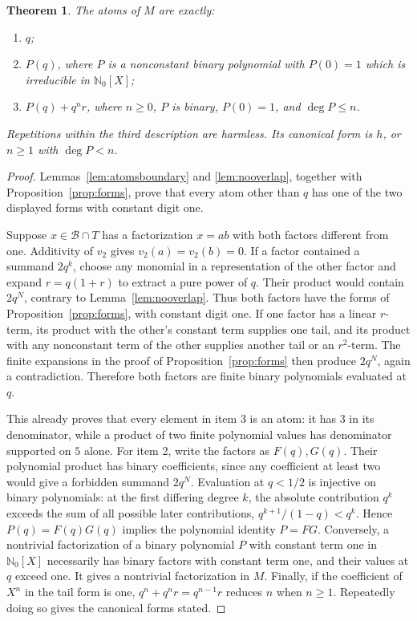 \documentclass[11pt]{article}
\newtheorem{theorem}{Theorem}[section]
\theoremstyle{definition}
\newcommand{\NN}{\mathbb N}
\begin{document}
\begin{theorem}\label{thm:classification}
The atoms of $M$ are exactly:
\begin{enumerate}
\item $q$;
\item $P(q)$, where $P$ is a nonconstant binary polynomial with $P(0)=1$
which is irreducible in $\NN_0[X]$;
\item $P(q)+q^nr$, where $n\ge0$, $P$ is binary, $P(0)=1$, and
$\deg P\le n$.
\end{enumerate}
Repetitions within the third description are harmless. Its canonical
form is $h$, or $n\ge1$ with $\deg P<n$.
\end{theorem}
\begin{proof}
Lemmas~\ref{lem:atomsboundary} and \ref{lem:nooverlap}, together with
Proposition~\ref{prop:forms}, prove that every atom other than $q$
has one of the two displayed forms with constant digit one.

Suppose $x\in\mathcal B\cap T$ has a factorization $x=ab$ with both
factors different from one. Additivity of $v_2$ gives $v_2(a)=v_2(b)=0$.
If a factor contained a summand $2q^k$,
choose any monomial in a representation of the other factor and
expand $r=q(1+r)$ to extract a pure power of $q$. Their product would
contain $2q^N$, contrary to Lemma~\ref{lem:nooverlap}.
Thus both factors have the forms of Proposition~\ref{prop:forms},
with constant digit one.
If one factor has a linear $r$-term, its product with the other's
constant term supplies one tail, and its product with any nonconstant
term of the other supplies another tail or an $r^2$-term. The finite
expansions in the proof of Proposition~\ref{prop:forms} then produce
$2q^N$, again a contradiction. Therefore both factors are finite
binary polynomials evaluated at $q$.

This already proves that every element in item 3 is an atom:
it has $3$ in its denominator, while a product of two finite
polynomial values has denominator supported on $5$ alone.
For item 2, write the factors as $F(q),G(q)$. Their polynomial
product has binary coefficients, since any coefficient at least two
would give a forbidden summand $2q^N$.
Evaluation at $q<1/2$ is injective on binary polynomials: at the
first differing degree $k$, the absolute contribution $q^k$
exceeds the sum of all possible later contributions,
$q^{k+1}/(1-q)<q^k$.
Hence $P(q)=F(q)G(q)$ implies the polynomial identity $P=FG$.
Conversely, a nontrivial factorization of a binary polynomial
$P$ with constant term one in $\NN_0[X]$ necessarily has binary
factors with constant term one, and their values at $q$ exceed one.
It gives a nontrivial factorization in $M$.
Finally, if the coefficient of $X^n$ in the tail form is one,
$q^n+q^nr=q^{n-1}r$ reduces $n$ when $n\ge1$.
Repeatedly doing so gives the canonical forms stated.
\end{proof}
\end{document}

